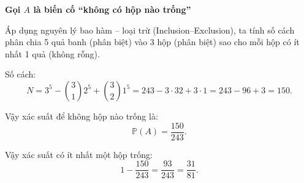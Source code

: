 \documentclass{article}
\begin{document}
	\textbf{Gọi $A$ là biến cố “không có hộp nào trống”}
	
	Áp dụng nguyên lý bao hàm – loại trừ (Inclusion–Exclusion), ta tính số cách phân chia 5 quả banh (phân biệt) vào 3 hộp (phân biệt) sao cho mỗi hộp có ít nhất 1 quả (không rỗng).
	
	Số cách:
	\[
	N = 3^5 - \binom{3}{1} 2^5 + \binom{3}{2} 1^5 = 243 - 3 \cdot 32 + 3 \cdot 1 = 243 - 96 + 3 = 150.
	\]
	
	Vậy xác suất để không hộp nào trống là:
	\[
	\mathbb{P}(A) = \frac{150}{243}.
	\]
	
	Vậy xác suất có ít nhất một hộp trống:
	\[
	1 - \frac{150}{243} = \frac{93}{243} = \frac{31}{81}.
	\]
	
\end{document}
